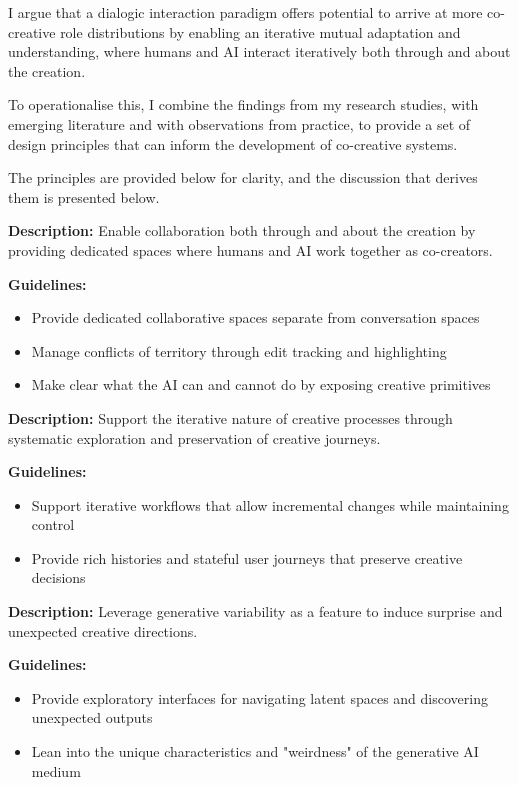 I argue that a dialogic interaction paradigm offers potential to arrive at more co-creative role distributions by enabling an iterative mutual adaptation and understanding, where humans and AI interact iteratively both through and about the creation.

To operationalise this, I combine the findings from my research studies, with emerging literature and with observations from practice, to provide a set of design principles that can inform the development of co-creative systems.

The principles are provided below for clarity, and the discussion that derives them is presented below.

\begin{tcolorbox}[colback=blue!5,colframe=blue!75!black,title=\textbf{Principle 1: Collaboration}]
\textbf{Description:} Enable collaboration both through and about the creation by providing dedicated spaces where humans and AI work together as co-creators.

\textbf{Guidelines:}
\begin{itemize}
\item Provide dedicated collaborative spaces separate from conversation spaces
\item Manage conflicts of territory through edit tracking and highlighting
\item Make clear what the AI can and cannot do by exposing creative primitives
\end{itemize}
\end{tcolorbox}

\begin{tcolorbox}[colback=green!5,colframe=green!75!black,title=\textbf{Principle 2: Iteration}]
\textbf{Description:} Support the iterative nature of creative processes through systematic exploration and preservation of creative journeys.

\textbf{Guidelines:}
\begin{itemize}
\item Support iterative workflows that allow incremental changes while maintaining control
\item Provide rich histories and stateful user journeys that preserve creative decisions
\end{itemize}
\end{tcolorbox}

\begin{tcolorbox}[colback=orange!5,colframe=orange!75!black,title=\textbf{Principle 3: Serendipity}]
\textbf{Description:} Leverage generative variability as a feature to induce surprise and unexpected creative directions.

\textbf{Guidelines:}
\begin{itemize}
\item Provide exploratory interfaces for navigating latent spaces and discovering unexpected outputs
\item Lean into the unique characteristics and "weirdness" of the generative AI medium
\end{itemize}
\end{tcolorbox}

